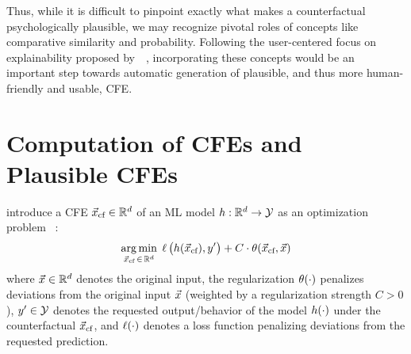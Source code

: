 Thus, while it is difficult to pinpoint exactly what makes a counterfactual psychologically plausible, we may recognize pivotal roles of concepts like comparative similarity and probability.
Following the user-centered focus on explainability proposed by~\citeauthor{miller_explanation_2019}~\citep{miller_explanation_2019}, incorporating these concepts would be an important step towards automatic generation of plausible, and thus more human-friendly and usable, \gls{CFE}.

\section{Computation of CFEs and Plausible CFEs}\label{sec:EffCompCFs}
\citeauthor{wachter_counterfactual_2017} introduce a \gls{CFE} ${\vec{x}_{\text{cf}}}\in\mathbb{R}^d$ of an \gls{ML} model $h:\mathbb{R}^d\to\mathcal{Y}$ as an optimization problem~\citep{wachter_counterfactual_2017} :
\begin{equation}\label{eq:counterfactual_opt_original}
\underset{{\vec{x}_{\text{cf}}} \,\in\, \mathbb{R}^d}{\arg\min}\; \operatorname*{{\ell}}\big(h({\vec{x}_{\text{cf}}}), y'\big) + C \cdot \operatorname*{{\theta}}({\vec{x}_{\text{cf}}}, \vec{x})
\end{equation}
where $\vec{x}\in\mathbb{R}^d$ denotes the original input, the regularization $\operatorname*{{\theta}}(\cdot)$ penalizes deviations from the original input $\vec{x}$ (weighted by a regularization strength $C>0$), $y'\in\mathcal{Y}$ denotes the requested output/behavior of the model $h(\cdot)$ under the counterfactual ${\vec{x}_{\text{cf}}}$, and $\operatorname*{{\ell}}(\cdot)$ denotes a loss function penalizing deviations from the requested prediction.

